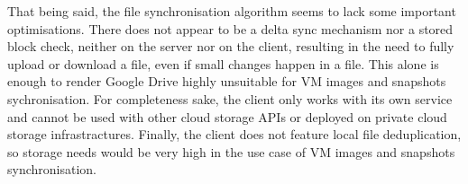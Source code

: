   That being said, the file synchronisation algorithm seems to lack some important optimisations. There does not appear to be a delta sync mechanism nor a stored block check, neither on the server nor on the client, resulting in the need to fully upload or download a file, even if small changes happen in a file. This alone is enough to render Google Drive highly unsuitable for VM images and snapshots sychronisation. For completeness sake, the client only works with its own service and cannot be used with other cloud storage APIs or deployed on private cloud storage infrastractures. Finally, the client does not feature local file deduplication, so storage needs would be very high in the use case of VM images and snapshots synchronisation.
